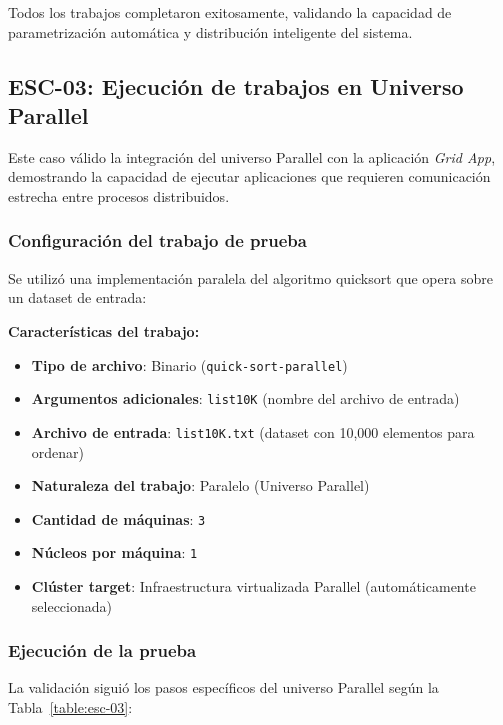 Todos los trabajos completaron exitosamente, validando la capacidad de parametrización automática y distribución inteligente del sistema.

\subsection{ESC-03: Ejecución de trabajos en Universo Parallel}
\noindent

Este caso válido la integración del universo Parallel con la aplicación \textit{Grid App}, demostrando la capacidad de ejecutar aplicaciones \MPI que requieren comunicación estrecha entre procesos distribuidos.

\subsubsection{Configuración del trabajo de prueba}
\noindent

Se utilizó una implementación paralela del algoritmo quicksort que opera sobre un dataset de entrada:

\textbf{Características del trabajo:}
\begin{itemize}
	\item \textbf{Tipo de archivo}: Binario \MPI (\texttt{quick-sort-parallel})
	\item \textbf{Argumentos adicionales}: \texttt{list10K} (nombre del archivo de entrada)
	\item \textbf{Archivo de entrada}: \texttt{list10K.txt} (dataset con 10,000 elementos para ordenar)
	\item \textbf{Naturaleza del trabajo}: Paralelo (Universo Parallel)
	\item \textbf{Cantidad de máquinas}: \texttt{3}
	\item \textbf{Núcleos por máquina}: \texttt{1}
	\item \textbf{Clúster target}: Infraestructura virtualizada Parallel (automáticamente seleccionada)
\end{itemize}

\subsubsection{Ejecución de la prueba}
\noindent

La validación siguió los pasos específicos del universo Parallel según la Tabla~\ref{table:esc-03}:

